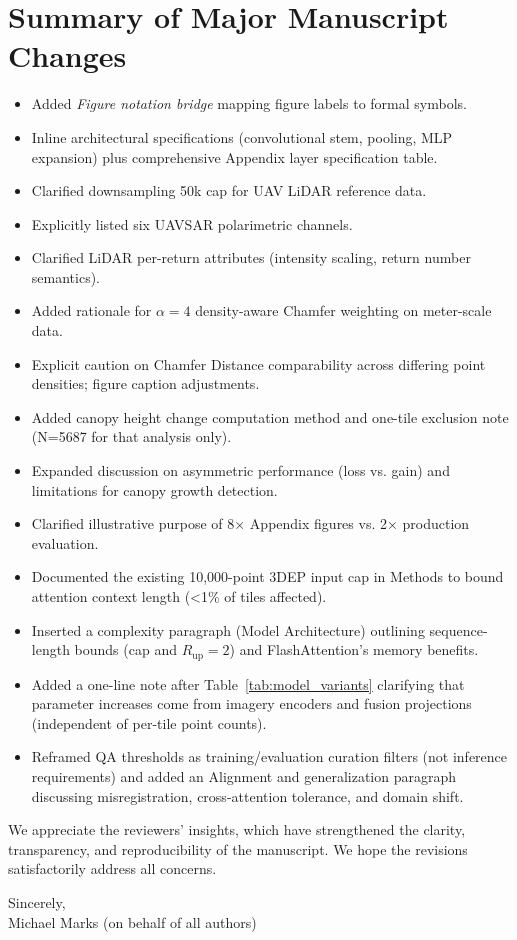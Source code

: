 \documentclass[11pt]{article}
\begin{document}
\section*{Summary of Major Manuscript Changes}
\begin{itemize}
  \item Added \emph{Figure notation bridge} mapping figure labels to formal symbols.
  \item Inline architectural specifications (convolutional stem, pooling, MLP expansion) plus comprehensive Appendix layer specification table.
  \item Clarified downsampling 50k cap for UAV LiDAR reference data.
  \item Explicitly listed six UAVSAR polarimetric channels.
  \item Clarified LiDAR per-return attributes (intensity scaling, return number semantics).
  \item Added rationale for $\alpha=4$ density-aware Chamfer weighting on meter-scale data.
  \item Explicit caution on Chamfer Distance comparability across differing point densities; figure caption adjustments.
  \item Added canopy height change computation method and one-tile exclusion note (N=5687 for that analysis only).
  \item Expanded discussion on asymmetric performance (loss vs. gain) and limitations for canopy growth detection.
  \item Clarified illustrative purpose of 8× Appendix figures vs. 2× production evaluation.
  \item Documented the existing 10,000-point 3DEP input cap in Methods to bound attention context length (\textless1\% of tiles affected).
  \item Inserted a complexity paragraph (Model Architecture) outlining sequence-length bounds (cap and $R_{\text{up}}{=}2$) and FlashAttention’s memory benefits.
  \item Added a one-line note after Table~\ref{tab:model_variants} clarifying that parameter increases come from imagery encoders and fusion projections (independent of per-tile point counts).
  \item Reframed QA thresholds as training/evaluation curation filters (not inference requirements) and added an Alignment and generalization paragraph discussing misregistration, cross-attention tolerance, and domain shift.
\end{itemize}

We appreciate the reviewers’ insights, which have strengthened the clarity, transparency, and reproducibility of the manuscript. We hope the revisions satisfactorily address all concerns.

\vspace{1em}
\noindent Sincerely,\\[4pt]
Michael Marks (on behalf of all authors)
\end{document}
